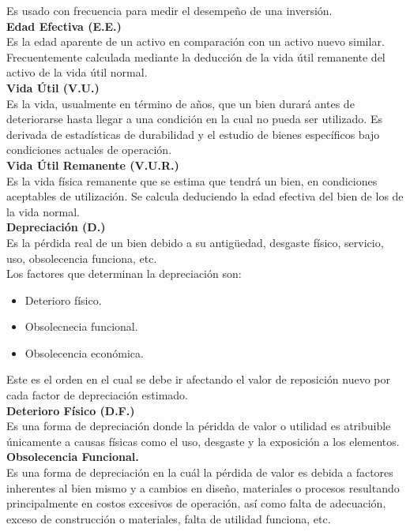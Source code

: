 Es usado con frecuencia para medir el desempeño de una inversión. \\[6mm] 
\textbf{Edad Efectiva (E.E.)} \\ 
Es la edad aparente de un activo en comparación con un activo nuevo similar. Frecuentemente calculada mediante la deducción de la vida útil remanente del activo de la vida útil normal. \\[6mm]
\textbf{Vida Útil (V.U.)} \\ 
Es la vida, usualmente en término de años, que un bien durará antes de deteriorarse hasta llegar a una condición en la cual no pueda ser utilizado.
Es derivada de estadísticas de durabilidad y el estudio de bienes específicos bajo condiciones actuales de operación. \\[6mm] 
\textbf{Vida Útil Remanente (V.U.R.)} \\ 
Es la vida física remanente que se estima que tendrá un bien, en condiciones aceptables de utilización.
Se calcula deduciendo la edad efectiva del bien de los de la vida normal. \\[6mm] 
\textbf{Depreciación (D.)} \\ 
Es la pérdida real de un bien debido a su antigüedad, desgaste físico, servicio, uso, obsolecencia funciona, etc. \\ 
Los factores que determinan la depreciación son:
\begin{itemize}
	\item Deterioro físico.
	\item Obsolecnecia funcional.
	\item Obsolecencia económica.
\end{itemize}
Este es el orden en el cual se debe ir afectando el valor de reposición nuevo por cada factor de depreciación estimado. \\[6mm] 
\textbf{Deterioro Físico  (D.F.)} \\ 
Es una forma de depreciación donde la péridda de valor o utilidad es atribuible únicamente a causas físicas como el uso, desgaste y la exposición a los elementos. \\[6mm] 
\textbf{Obsolecencia Funcional.} \\ 
Es una forma de depreciación en la cuál la pérdida de valor es debida a factores inherentes al bien mismo y a cambios en diseño, materiales o procesos resultando principalmente en costos excesivos de operación, así como falta de adecuación, exceso de construcción o materiales, falta de utilidad funciona, etc. \\[6mm] 
